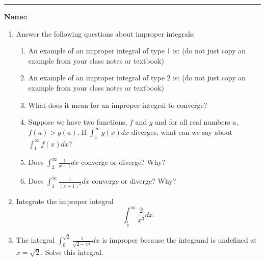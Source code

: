 \documentclass[11pt]{article}
\newcommand{\bas}[1]{\begin{align*}{#1}\end{align*}}
\begin{document}
    \hrule
    \vspace{.5cm}
    \noindent\textbf{Name:} \underline{\qquad\qquad\qquad\qquad\qquad\qquad\qquad\qquad\qquad\qquad\qquad\qquad\qquad}

    \begin{enumerate}
        \item Answer the following questions about improper integrals:
        \begin{enumerate}
            \item An example of an improper integral of type 1 is: (do not just copy an example from your class notes or textbook)\vfill
            \item An example of an improper integral of type 2 is: (do not just copy an example from your class notes or textbook)\vfill
            \item What does it mean for an improper integral to converge?\vfill
            \item Suppose we have two functions, $f$ and $g$ and for all real numbers $a$, $f(a)>g(a)$. If $\int_{1}^{\infty}g(x)dx$ diverges, what can we say about $\int_{1}^{\infty}f(x)dx$?\vfill
            \item Does $\int_{2}^{\infty}\frac{1}{x-1}dx$ converge or diverge? Why?\vfill
            \item Does $\int_{1}^{\infty}\frac{1}{(x+1)^{2}}dx$ converge or diverge? Why?\vfill
        \end{enumerate}
        \newpage
        \item Integrate the improper integral $$\int_{\frac{1}{2}}^{\infty}\frac{2}{x^{3}}dx.$$
        \vfill
        \item The integral $\displaystyle\int_{0}^{\sqrt{2}}\frac{1}{\sqrt{2-x^{2}}}dx$ is improper because the integrand is undefined at $x=\sqrt{2}$. Solve this integral.

\end{enumerate}
\end{document}
